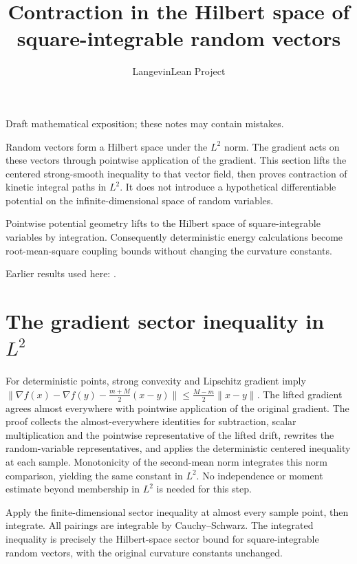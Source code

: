 \documentclass[11pt,a4paper]{article}
\title{\texorpdfstring{Contraction in the Hilbert space of square-integrable random vectors}{Contraction in the Hilbert space of square-integrable random vectors}}
\author{LangevinLean Project}
\date{}
\begin{document}
\maketitle
Draft mathematical exposition; these notes may contain mistakes.


Random vectors form a Hilbert space under the \(L^{2}\) norm. The gradient acts on these vectors through pointwise application of the gradient. This section lifts the centered strong-smooth inequality to that vector field, then proves contraction of kinetic integral paths in \(L^{2}\). It does not introduce a hypothetical differentiable potential on the infinite-dimensional space of random variables.



Pointwise potential geometry lifts to the Hilbert space of square-integrable variables by integration. Consequently deterministic energy calculations become root-mean-square coupling bounds without changing the curvature constants.



Earlier results used here: \cite[Section~3.13]{LangevinLean2026ULASC}.

\section{\texorpdfstring{The gradient sector inequality in \(L^{2}\)}{The gradient sector inequality in L²}}


For deterministic points, strong convexity and Lipschitz gradient imply \(\|\nabla f(x)-\nabla f(y)-\frac{m+M}{2}(x-y)\|\le\frac{M-m}{2}\|x-y\|\). The lifted gradient agrees almost everywhere with pointwise application of the original gradient. The proof collects the almost-everywhere identities for subtraction, scalar multiplication and the pointwise representative of the lifted drift, rewrites the random-variable representatives, and applies the deterministic centered inequality at each sample. Monotonicity of the second-mean norm integrates this norm comparison, yielding the same constant in \(L^{2}\). No independence or moment estimate beyond membership in \(L^{2}\) is needed for this step.



Apply the finite-dimensional sector inequality at almost every sample point, then integrate. All pairings are integrable by Cauchy–Schwarz. The integrated inequality is precisely the Hilbert-space sector bound for square-integrable random vectors, with the original curvature constants unchanged.
\end{document}
